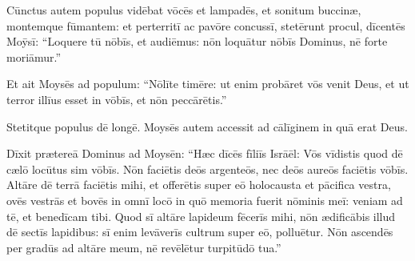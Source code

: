 Cūnctus autem populus
vidēbat vōcēs et lampadēs, et sonitum buccinæ, montemque
fūmantem: et perterritī ac pavōre concussī, stetērunt procul, 
dīcentēs
Moȳsī: ``Loquere tū nōbīs, et audiēmus: nōn loquātur nōbīs Dominus, nē
forte moriāmur.'' 

Et ait Moysēs ad populum: ``Nōlīte timēre: ut
enim probāret vōs venit Deus, et ut terror illīus
esset in vōbīs, et nōn peccārētis.''

Stetitque populus dē longē. Moysēs autem accessit ad
cālīginem in quā erat Deus. 

Dīxit prætereā Dominus ad
Moysēn: ``Hæc dīcēs fīliīs Isrāēl: Vōs
vīdistis quod dē cælō locūtus sim vōbīs. 
Nōn faciētis deōs argenteōs,
nec deōs aureōs faciētis vōbīs. 
Altāre dē terrā faciētis mihi, et
offerētis super eō holocausta et
pācifica vestra, ovēs vestrās et bovēs
in omnī locō in quō memoria fuerit nōminis meī: veniam ad tē, et
benedīcam tibi. 
Quod sī altāre lapideum
fēcerīs mihi, nōn ædificābis illud dē sectīs lapidibus: sī
enim levāverīs cultrum super eō, polluētur. 
Nōn ascendēs
per gradūs ad altāre meum, nē revēlētur
turpitūdō tua.''
